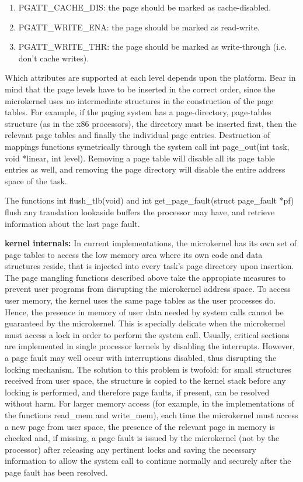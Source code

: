 \documentclass[11pt, letterpaper, twoside, english]{book}
\begin{document}
\begin{enumerate}
\item[] \textsf{PGATT\_CACHE\_DIS}: the page should be marked as cache-disabled.
\item[] \textsf{PGATT\_WRITE\_ENA}: the page should be marked as read-write.
\item[] \textsf{PGATT\_WRITE\_THR}: the page should be marked as write-through (i.e. don't cache writes).
\end{enumerate}

Which attributes are supported at each level depends upon the platform. Bear in mind that the page levels have to be inserted in the correct order, since the microkernel uses no intermediate structures in the construction of the page tables. For example, if the paging system has a page-directory, page-tables structure (as in the x86 processors), the directory must be inserted first, then the relevant page tables and finally the individual page entries. Destruction of mappings functions symetrically through the system call \textsf{int page\_out(int task, void *linear, int level)}. Removing a page table will disable all its page table entries as well, and removing the page directory will disable the entire address space of the task.

The functions \textsf{int flush\_tlb(void)} and \textsf{int get\_page\_fault(struct page\_fault *pf)} flush any translation lookaside buffers the processor may have, and retrieve information about the last page fault.

\textbf{kernel internals:} In current implementations, the microkernel has its own set of page tables to access the low memory area where its own code and data structures reside, that is injected into every task's page directory upon insertion. The page mangling functions described above take the appropiate measures to prevent user programs from disrupting the microkernel address space. To access user memory, the kernel uses the same page tables as the user processes do. Hence, the presence in memory of user data needed by system calls cannot be guaranteed by the microkernel. This is specially delicate when the microkernel must access a lock in order to perform the system call. Usually, critical sections are implemented in single processor kernels by disabling the interrupts. However, a page fault may well occur with interruptions disabled, thus disrupting the locking mechanism. The solution to this problem is twofold: for small structures received from user space, the structure is copied to the kernel stack before any locking is performed, and therefore page faults, if present, can be resolved without harm. For larger memory access (for example, in the implementations of the functions \textsf{read\_mem} and \textsf{write\_mem}), each time the microkernel must access a new page from user space, the presence of the relevant page in memory is checked and, if missing, a page fault is issued by the microkernel (not by the processor) after releasing any pertinent locks and saving the necessary information to allow the system call to continue normally and securely after the page fault has been resolved.
\end{document}
